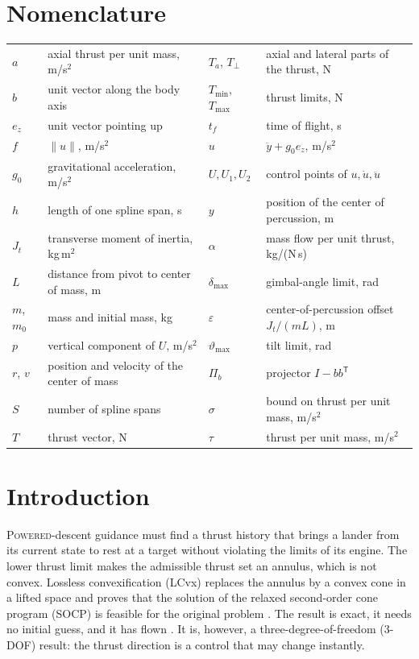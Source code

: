 \documentclass[10pt,letterpaper]{article}
\theoremstyle{aiaa}
\newcommand{\norm}[1]{\lVert #1\rVert}
\newcommand{\ez}{e_z}
\newcommand{\Pib}{\Pi_b}
\newcommand{\Tmin}{T_{\min}}
\newcommand{\Tmax}{T_{\max}}
\newcommand{\dmax}{\delta_{\max}}
\newcommand{\thmax}{\vartheta_{\max}}
\begin{document}
\section{Nomenclature}
{\renewcommand{\arraystretch}{1.0}\noindent
\begin{tabular}{@{}l@{\ \,=\ \,}l@{\hspace{0.22in}}l@{\ \,=\ \,}l@{}}
$a$ & axial thrust per unit mass, m/s$^2$ & $T_a$, $T_\perp$ & axial and lateral parts of the thrust, N \\
$b$ & unit vector along the body axis & $\Tmin$, $\Tmax$ & thrust limits, N \\
$\ez$ & unit vector pointing up & $t_f$ & time of flight, s \\
$f$ & $\norm{u}$, m/s$^2$ & $u$ & $\ddot y+g_0\ez$, m/s$^2$ \\
$g_0$ & gravitational acceleration, m/s$^2$ & $U,U_1,U_2$ & control points of $u,\dot u,\ddot u$ \\
$h$ & length of one spline span, s & $y$ & position of the center of percussion, m \\
$J_t$ & transverse moment of inertia, kg\,m$^2$ & $\alpha$ & mass flow per unit thrust, kg/(N\,s) \\
$L$ & distance from pivot to center of mass, m & $\dmax$ & gimbal-angle limit, rad \\
$m$, $m_0$ & mass and initial mass, kg & $\varepsilon$ & center-of-percussion offset $J_t/(mL)$, m \\
$p$ & vertical component of $U$, m/s$^2$ & $\thmax$ & tilt limit, rad \\
$r$, $v$ & position and velocity of the center of mass & $\Pib$ & projector $I-bb^{\mathsf T}$ \\
$S$ & number of spline spans & $\sigma$ & bound on thrust per unit mass, m/s$^2$ \\
$T$ & thrust vector, N & $\tau$ & thrust per unit mass, m/s$^2$ \\
\end{tabular}}

\section{Introduction}
\lettrine{P}{owered}-descent guidance must find a thrust history that brings a lander from its current state to rest at a target
without violating the limits of its engine. The lower thrust limit makes the admissible thrust set an annulus, which is not
convex. Lossless convexification (LCvx) replaces the annulus by a convex cone in a lifted space and proves that the solution of
the relaxed second-order cone program (SOCP) is feasible for the original problem \cite{acikmese2007,acikmese2011,acikmese2013}.
The result is exact, it needs no initial guess, and it has flown \cite{malyuta2022}. It is, however, a three-degree-of-freedom
(3-DOF) result: the thrust direction is a control that may change instantly.
\end{document}
